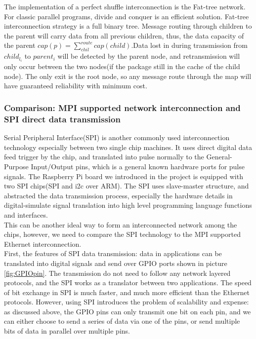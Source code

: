 \documentclass[11pt,openright,a4paper]{report}
\begin{document}
The implementation of a perfect shuffle interconnection is the Fat-tree network. For classic parallel programs, divide and conquer is an efficient solution\cite{aho1974design}. Fat-tree interconnection strategy is a full binary tree. Message routing through children to the parent will carry data from all previous children, thus, the data capacity of the parent $cap(p)=\sum_{chil}^{route}cap(child)$.Data lost in during transmission from $child_{l_{i}}$ to $parent_{i}$ will be detected by the parent node, and retransmission will only occur between the two nodes(if the package still in the cache of the child node). The only exit is the root node, so any message route through the map will have guaranteed reliability with minimum cost.

\subsubsection{Comparison: MPI supported network interconnection and SPI direct data transmission}
Serial Peripheral Interface(SPI) is another commonly used interconnection technology especially between two single chip machines\cite{junger2007method}. It uses direct digital data feed trigger by the chip, and translated into pulse normally to the General-Purpose Input/Output pins, which is a general known hardware ports for pulse signals\cite{lin2008transmission}. The Raspberry Pi board we introduced in the project is equipped with two SPI chips(SPI and i2c over ARM)\cite{jain2014raspberry}. The SPI uses slave-master structure, and abstracted the data transmission process, especially the hardware details in digital-simulate signal translation into high level programming language functions and interfaces.\\
This can be another ideal way to form an interconnected network among the chips, however, we need to compare the SPI technology to the MPI supported Ethernet interconnection.\\
First, the features of SPI data transmission: data in applications can be translated into digital signals and send over GPIO ports shown in picture \ref{fig:GPIOpin}. The transmission do not need to follow any network layered protocols, and the SPI works as a translator between two applications. The speed of bit exchange in SPI is much faster, and much more efficient than the Ethernet protocols. However, using SPI introduces the problem of scalability and expense: as discussed above, the GPIO pins can only transmit one bit on each pin, and we can either choose to send a series of data via one of the pins, or send multiple bits of data in parallel over multiple pins.\\
\end{document}
